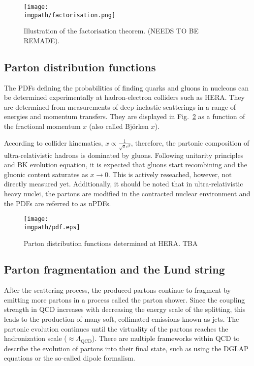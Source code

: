 \begin{figure}[H]
\texttt{[image: \\imgpath/factorisation.png]}
\caption{Illustration of the factorisation theorem. (NEEDS TO BE REMADE).}
\label{fig:intro:factorisation}
\end{figure}

\subsection{Parton distribution functions}

The PDFs defining the probabilities of finding quarks and gluons in nucleons can be determined experimentally at hadron-electron colliders such as HERA. They are determined from measurements of deep inelastic scatterings in a range of energies and momentum transfers. They are displayed in Fig.~\ref{fig:intro:pdfs} as a function of the fractional momentum $x$ (also called Bj\"orken $x$). 

According to collider kinematics, $x \propto \frac{1}{\sqrt{s}e^y}$, therefore, the partonic composition of ultra-relativistic hadrons is dominated by gluons. Following unitarity principles and BK evolution equation, it is expected that gluons start recombining and the gluonic content saturates as $x\rightarrow0$. This is actively reseached, however, not directly measured yet. Additionally, it should be noted that in ultra-relativistic heavy nuclei, the partons are modified in the contracted nuclear environment and the PDFs are referred to as nPDFs.

\begin{figure}[H]
\texttt{[image: \\imgpath/pdf.eps]}
\caption{Parton distribution functions determined at HERA. TBA}
\label{fig:intro:pdfs}
\end{figure}

\subsection{Parton fragmentation and the Lund string}

After the scattering process, the produced partons continue to fragment by emitting more partons in a process called the parton shower. Since the coupling strength in QCD increases with decreasing the energy scale of the splitting, this leads to the production of many soft, collimated emissions known as jets. The partonic evolution continues until the virtuality of the partons reaches the hadronization scale ($\approx \Lambda_\mathrm{QCD}$). There are multiple frameworks within QCD to describe the evolution of partons into their final state, such as using the DGLAP equations or the so-called dipole formalism.

